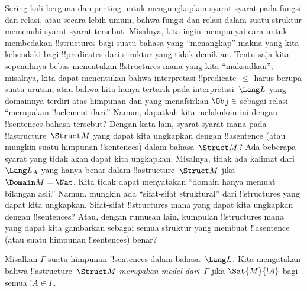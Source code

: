 \documentclass[../../../include/open-logic-section]{subfiles}
\begin{document}


\begin{explain}
Sering kali berguna dan penting untuk mengungkapkan syarat-syarat pada fungsi
dan relasi, atau secara lebih umum, bahwa fungsi dan relasi dalam suatu
struktur memenuhi syarat-syarat tersebut. Misalnya, kita ingin mempunyai cara
untuk membedakan !!{structure}s bagi suatu bahasa yang ``menangkap'' makna
yang kita kehendaki bagi !!{predicate}s dari struktur yang tidak demikian.
Tentu saja kita sepenuhnya bebas menentukan !!{structure}s mana yang kita
``maksudkan''; misalnya, kita dapat menentukan bahwa interpretasi
!!{predicate}~$\le$ harus berupa suatu urutan, atau bahwa kita hanya tertarik
pada interpretasi~$\Lang L$ yang domainnya terdiri atas himpunan dan yang
menafsirkan $\Obj \in$ sebagai relasi ``merupakan !!a{element} dari.'' Namun,
dapatkah kita melakukan ini dengan !!{sentence}s bahasa tersebut? Dengan kata
lain, syarat-syarat mana pada !!a{structure}~$\Struct M$ yang dapat kita
ungkapkan dengan !!a{sentence} (atau mungkin suatu himpunan !!{sentence}s)
dalam bahasa~$\Struct M$? Ada beberapa syarat yang tidak akan dapat kita
ungkapkan. Misalnya, tidak ada kalimat dari~$\Lang L_A$ yang hanya benar dalam
!!a{structure}~$\Struct M$ jika $\Domain M = \Nat$. Kita tidak dapat
menyatakan ``domain hanya memuat bilangan asli.'' Namun, mungkin ada
``sifat-sifat struktural'' dari !!{structure}s yang dapat kita ungkapkan.
Sifat-sifat !!{structure}s mana yang dapat kita ungkapkan dengan
!!{sentence}s? Atau, dengan rumusan lain, kumpulan !!{structure}s mana yang
dapat kita gambarkan sebagai semua struktur yang membuat !!a{sentence} (atau
suatu himpunan !!{sentence}s) benar?
\end{explain}

\begin{defn}
Misalkan $\Gamma$ suatu himpunan !!{sentence}s dalam bahasa~$\Lang L$. Kita
mengatakan bahwa !!a{structure}~$\Struct M$ \emph{merupakan model
dari}~$\Gamma$ jika $\Sat{M}{!A}$ bagi semua $!A \in \Gamma$.
\end{defn}
\end{document}
